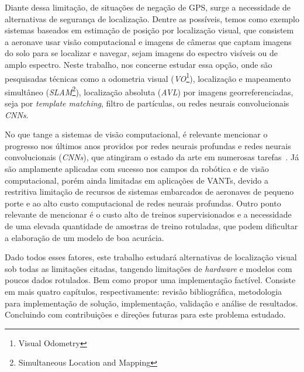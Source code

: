 Diante dessa limitação, de situações de negação de GPS, surge a necessidade de alternativas de segurança de localização. Dentre as possíveis, temos como exemplo sistemas baseados em estimação de posição por localização visual, que consistem a aeronave usar visão computacional e imagens de câmeras que captam imagens do solo para se localizar e navegar, sejam imagens do espectro visíveis ou de amplo espectro. Neste trabalho, nos concerne estudar essa opção, onde são pesquisadas técnicas como a odometria visual (\textit{VO}\footnote{Visual Odometry}), localização e mapeamento simultâneo (\textit{SLAM}\footnote{Simultaneous Location and Mapping}), localização absoluta (\textit{AVL}) por imagens georreferenciadas, seja por \textit{template matching}, filtro de partículas, ou redes neurais convolucionais \textit{CNNs}.

No que tange a sistemas de visão computacional, é relevante mencionar o progresso nos últimos anos providos por redes neurais profundas e redes neurais convolucionais (\textit{CNNs}), que atingiram o estado da arte em numerosas tarefas~\cite{ABIODUN2018e00938}. Já são amplamente aplicadas com sucesso nos campos da robótica e de visão computacional, porém ainda limitadas em aplicações de VANTs, devido a restritiva limitação de recursos de sistemas embarcados de aeronaves de pequeno porte e ao alto custo computacional de redes neurais profundas. Outro ponto relevante de mencionar é o custo alto de treinos supervisionados e a necessidade de uma elevada quantidade de amostras de treino rotuladas, que podem dificultar a elaboração de um modelo de boa acurácia.

Dado todos esses fatores, este trabalho estudará alternativas de localização visual sob todas as limitações citadas, tangendo limitações de \textit{hardware} e modelos com poucos dados rotulados. Bem como propor uma implementação factível. Consiste em mais quatro capítulos, respectivamente: revisão bibliográfica, metodologia para implementação de solução, implementação, validação e análise de resultados. Concluindo com contribuições e direções futuras para este problema estudado.
